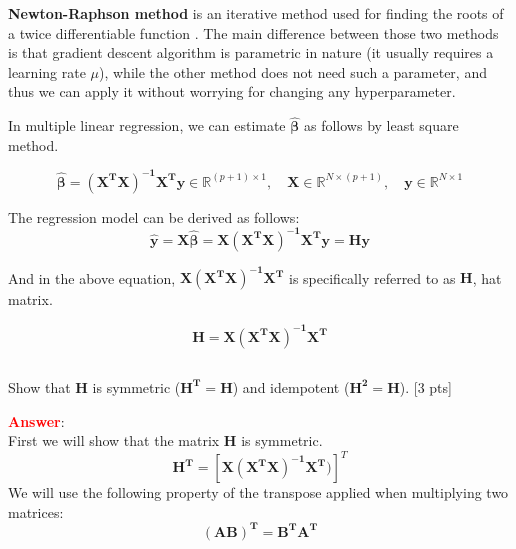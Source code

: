 \documentclass{homework}
\begin{document}
\begin{enumerate}
        \textbf{Newton-Raphson method} is an iterative method used for finding the roots of a twice differentiable function . The main difference between those two methods is that gradient descent algorithm is parametric in nature (it usually requires a learning rate $\mu$), while the other method does not need such a parameter, and thus we can apply it without worrying for changing any hyperparameter.
        
        
        
    \end{enumerate}
    \vspace{10mm}
    
    
    
    
    \exercise*    
    In multiple linear regression, we can estimate $\hat{\mathbf{\beta}}$ as follows by least square method.
    
    \begin{equation}
    \hat{\mathbf{\beta}}= \mathbf{(X^TX)^{-1}X^Ty} \in \mathbb{R}^{(p+1) \times 1}, \label{eq:3-2}
    \quad 
    \mathbf{X} \in \mathbb{R}^{N\times(p+1)},
    \quad
    \mathbf{y} \in \mathbb{R}^{N\times1}
    \end{equation}
    
    The regression model can be derived as follows:
    \begin{equation}
    \hat{\mathbf{y}} = \mathbf{X\hat{\beta}} = \mathbf{X(X^TX)^{-1}X^Ty} = \mathbf{Hy} 
    \end{equation}
    
    
    And in the above equation, $\mathbf{X(X^TX)^{-1}X^T}$ is specifically referred to as $\textbf{H}$, hat matrix.
    
    \begin{equation}
    \mathbf{H}= \mathbf{X(X^TX)^{-1}X^T} 
    \end{equation}
    
    \subsection{}
    Show that $\textbf{H}$ is symmetric ($\mathbf{H^T}= \mathbf{H}$) and idempotent ($\mathbf{H^2} = \mathbf{H}$). [3 pts]

    \textbf{\textcolor{red}{Answer}}: \\
    First we will show that the matrix $\mathbf{H}$ is symmetric.
    \[ \mathbf{H^T} = \left[\mathbf{X(X^TX)^{-1}X^T})\right]^{T} \]
    We will use the following property of the transpose applied when multiplying two matrices:
    \begin{equation}
        \mathbf{(AB)^{T}} = \mathbf{B^{T}A^{T}}
    \end{equation}
    
\end{document}
